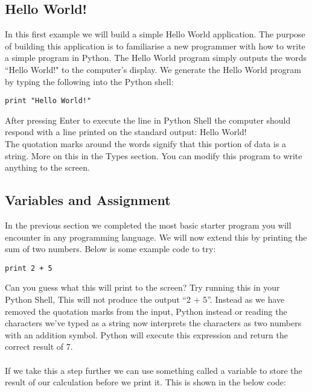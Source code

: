 \documentclass[twocolumn]{article}
\begin{document}
\subsection{Hello World!}

In this first example we will build a simple Hello World application. The purpose of building this application is to familiarise a new programmer with how to write a simple program in Python. The Hello World program simply outputs the words ``Hello World!" to the computer's display. We generate the Hello World program by typing the following into the Python shell:\\

\begin{lstlisting}
print "Hello World!"
\end{lstlisting}
After pressing Enter to execute the line in Python Shell the computer should respond with a line printed on the standard output: Hello World!\\ The quotation marks around the words signify that this portion of data is a string. More on this in the Types section. You can modify this program to write anything to the screen.


\subsection{Variables and Assignment}

In the previous section we completed the most basic starter program you will encounter in any programming language. We will now extend this by printing the sum of two numbers. Below is some example code to try:

\begin{lstlisting}
print 2 + 5
\end{lstlisting}
Can you guess what this will print to the screen? Try running this in your Python Shell, This will not produce the output ``2 + 5''. Instead as we have removed the quotation marks from the input, Python instead or reading the characters we've typed as a string now interprets the characters as two numbers with an addition symbol. Python will execute this expression and return the correct result of 7. \\
\\
If we take this a step further we can use something called a variable to store the result of our calculation before we print it. This is shown in the below code:
\end{document}
